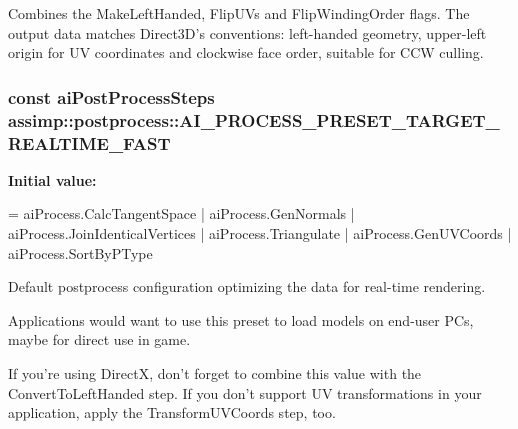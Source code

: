 Combines the {\ttfamily Make\+Left\+Handed}, {\ttfamily Flip\+U\+Vs} and {\ttfamily Flip\+Winding\+Order} flags. The output data matches Direct3\+D's conventions\+: left-\/handed geometry, upper-\/left origin for U\+V coordinates and clockwise face order, suitable for C\+C\+W culling. \hypertarget{namespaceassimp_1_1postprocess_a85780f5bf67521690acbc366347cb991}{
\subsubsection[{A\+I\+\_\+\+P\+R\+O\+C\+E\+S\+S\+\_\+\+P\+R\+E\+S\+E\+T\+\_\+\+T\+A\+R\+G\+E\+T\+\_\+\+R\+E\+A\+L\+T\+I\+M\+E\+\_\+\+F\+A\+S\+T}]{\setlength{\rightskip}{0pt plus 5cm}const {\bf ai\+Post\+Process\+Steps} assimp\+::postprocess\+::\+A\+I\+\_\+\+P\+R\+O\+C\+E\+S\+S\+\_\+\+P\+R\+E\+S\+E\+T\+\_\+\+T\+A\+R\+G\+E\+T\+\_\+\+R\+E\+A\+L\+T\+I\+M\+E\+\_\+\+F\+A\+S\+T}}\label{namespaceassimp_1_1postprocess_a85780f5bf67521690acbc366347cb991}
{\bfseries Initial value\+:}
\begin{DoxyCode}
=
      aiProcess.CalcTangentSpace |
      aiProcess.GenNormals |
      aiProcess.JoinIdenticalVertices |
      aiProcess.Triangulate |
      aiProcess.GenUVCoords |
      aiProcess.SortByPType
\end{DoxyCode}
Default postprocess configuration optimizing the data for real-\/time rendering.

Applications would want to use this preset to load models on end-\/user P\+Cs, maybe for direct use in game.

If you're using Direct\+X, don't forget to combine this value with the {\ttfamily Convert\+To\+Left\+Handed} step. If you don't support U\+V transformations in your application, apply the {\ttfamily Transform\+U\+V\+Coords} step, too.

